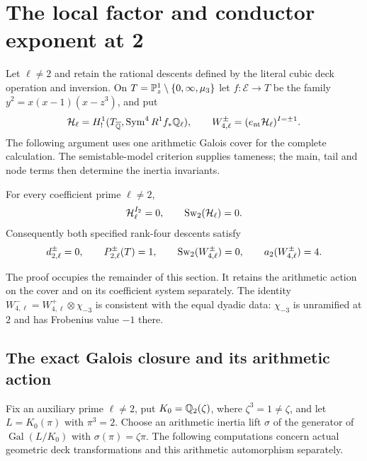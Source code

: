 \section{The local factor and conductor exponent at 2}\label{sec:local-two}
Let $\ell\ne2$ and retain the rational descents defined by the literal
cubic deck operation and inversion. On
$T=\mathbb P^1_z\setminus\{0,\infty,\mu_3\}$ let
$f:\mathcal E\to T$ be the family $y^2=x(x-1)(x-z^3)$, and put
\[
 \mathcal H_\ell=H^1_!(T_{\overline{\mathbb Q}},\operatorname{Sym}^4R^1f_*\mathbb Q_\ell),
 \qquad W_{4,\ell}^{\pm}=(e_{\mathrm{nt}}\mathcal H_\ell)^{I=\pm1}.
\]
The following argument uses one arithmetic Galois cover for the complete
calculation. The semistable-model criterion supplies tameness; the main,
tail and node terms then determine the inertia invariants.

\begin{theorem}\label{p2:thm:dyadic-local-data}
For every coefficient prime $\ell\ne2$,
\[
 \mathcal H_\ell^{I_2}=0,\qquad
 \operatorname{Sw}_2(\mathcal H_\ell)=0.
\]
Consequently both specified rank-four descents satisfy
\[
 d_{2,\ell}^{\pm}=0,\qquad P_{2,\ell}^{\pm}(T)=1,\qquad
 \operatorname{Sw}_2(W_{4,\ell}^{\pm})=0,\qquad a_2(W_{4,\ell}^{\pm})=4.
\]
\end{theorem}
The proof occupies the remainder of this section. It retains the
arithmetic action on the cover and on its coefficient system separately.
The identity $W^-_{4,\ell}=W^+_{4,\ell}\otimes\chi_{-3}$ is consistent
with the equal dyadic data: $\chi_{-3}$ is unramified at $2$ and has
Frobenius value $-1$ there.

\subsection{The exact Galois closure and its arithmetic action}
Fix an auxiliary prime $\ell\ne2$, put $K_0=\mathbb Q_2(\zeta)$, where
$\zeta^3=1\ne\zeta$, and let $L=K_0(\pi)$ with $\pi^3=2$.
Choose an arithmetic inertia lift $\sigma$ of the generator of
$\operatorname{Gal}(L/K_0)$ with $\sigma(\pi)=\zeta\pi$.
The following computations concern actual geometric deck transformations
and this arithmetic automorphism separately.

